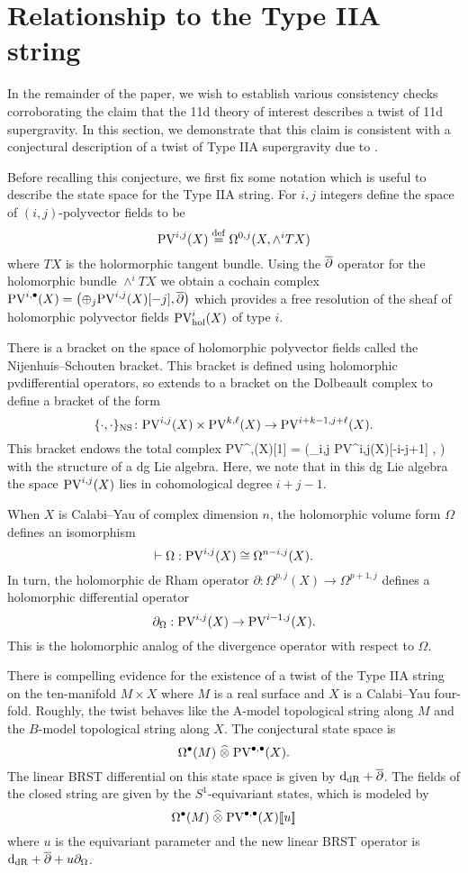 \documentclass[11pt]{amsart}
\def\pv{{\rm PV}}
\def\PV{{\rm PV}}
\begin{document}
\section{Relationship to the Type IIA string}
\label{sec:org355a726}
In the remainder of the paper, we wish to establish various consistency checks corroborating the claim that the 11d theory of interest describes a twist of 11d supergravity. In this section, we demonstrate that this claim is consistent with a conjectural description of a twist of Type IIA supergravity due to \cite{CLsugra}.

Before recalling this conjecture, we first fix some notation which is useful to describe the state space for the Type IIA string. 
For $i,j$ integers define the space of $(i,j)$-polyvector fields to be
\[
  \pv^{i,j}(X) \define \Omega^{0,j}(X, \wedge^{i} TX)
\]
where $TX$ is the holormorphic tangent bundle.
Using the $\overline{\partial}$ operator for the holomorphic bundle $\wedge^{i}TX$ we obtain a cochain complex $\pv^{i,\bu}(X) = \left(\oplus_{j} \pv^{i,j}(X) [-j], \dbar \right)$ which provides a free resolution of the sheaf of holomorphic polyvector fields $\PV^{i}_{\rm hol}(X)$ of type $i$.

There is a bracket on the space of holomorphic polyvector fields called the Nijenhuis--Schouten bracket.
This bracket is defined using holomorphic pvdifferential operators, so extends to a bracket on the Dolbeault complex to define a bracket of the form
\[
  \{\cdot, \cdot\}_{\rm NS} \colon \pv^{i,j}(X) \times \pv^{k,\ell}(X) \to \PV^{i+k-1, j+\ell}(X) .
\]
This bracket endows the total complex
\beqn\label{eqn:pvlie1}
\pv^{\bu,\bu}(X)[1] = \left(\oplus_{i,j} \pv^{i,j}(X)[-i-j+1] , \dbar \right)
\eeqn
with the structure of a dg Lie algebra.
Here, we note that in this dg Lie algebra the space $\pv^{i,j}(X)$ lies in cohomological degree $i+j-1$.

When $X$ is Calabi--Yau of complex dimension $n$, the holomorphic volume form $\Omega$ defines an isomorphism
\[
  \vdash \Omega : \pv^{i,j}(X) \cong \Omega^{n-i, j}(X).
\]
In turn, the holomorphic de Rham operator $\partial : \Omega^{p, j}(X) \to \Omega^{p+1,j}$ defines a holomorphic differential operator
\[
  \partial_{\Omega} : \pv^{i,j}(X) \to \pv^{i-1,j}(X) .
\]
This is the holomorphic analog of the divergence operator with respect to $\Omega$.

There is compelling evidence \cite{CLsugra} for the existence of a twist of the Type IIA string on the ten-manifold $M \times X$ where $M$ is a real surface and $X$ is a Calabi--Yau four-fold.
Roughly, the twist behaves like the A-model topological string along $M$ and the $B$-model topological string along $X$.
The conjectural state space is
\[
  \Omega^\bu(M) \; \Hat{\otimes} \; \PV^{\bu, \bu} (X) .
\]
The linear BRST differential on this state space is given by ${\rm d}_{\rm dR} + \overline{\partial}$.
The fields of the closed string are given by the $S^1$-equivariant states, which is modeled \cite{CLbcov} by
\[
  \Omega^\bu(M) \; \Hat{\otimes} \; \PV^{\bu, \bu} (X) [\![u]\!]
\]
where $u$ is the equivariant parameter and the new linear BRST operator is ${\rm d}_{\rm dR} + \overline{\partial} + u \partial_\Omega$.
\end{document}
